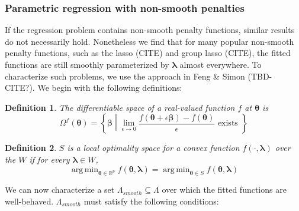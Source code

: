 \documentclass[12pt]{article}
\newtheorem{definition}{Definition}
\DeclareMathOperator*{\argmin}{arg\,min}
\begin{document}
\subsubsection{Parametric regression with non-smooth penalties}

If the regression problem contains non-smooth penalty functions, similar results do not necessarily hold. Nonetheless we find that for many popular non-smooth penalty functions, such as the lasso (CITE) and group lasso (CITE), the fitted functions are still smoothly parameterized by $\boldsymbol \lambda$ almost everywhere. To characterize such problems, we use the approach in Feng \& Simon (TBD- CITE?). We begin with the following definitions:

\begin{definition}
	The differentiable space of a real-valued function $f$ at $\boldsymbol{\theta}$ is
	\begin{equation}
	\Omega^{f}(\boldsymbol{\theta}) = \left \{ \boldsymbol{\beta} \middle | \lim_{\epsilon \rightarrow 0} \frac{f(\boldsymbol{\theta} + \epsilon \boldsymbol{\beta}) - f(\boldsymbol{\theta})}{\epsilon} \text{ exists } \right \}
	\end{equation}
\end{definition}

\begin{definition}
	$S$ is a local optimality space for a convex function $f(\cdot, \boldsymbol \lambda)$ over the $W$ if for every $\boldsymbol \lambda \in W$,
	\begin{equation}
	\argmin_{\boldsymbol{\theta} \in \mathbb{R}^p} f(\boldsymbol{\theta}, \boldsymbol \lambda) =
	\argmin_{\boldsymbol{\theta} \in S} f(\boldsymbol{\theta}, \boldsymbol \lambda)
	\end{equation}
\end{definition}

We can now characterize a set $\Lambda_{smooth} \subseteq \Lambda$ over which the fitted functions are well-behaved. $\Lambda_{smooth}$ must satisfy the following conditions:
\end{document}
